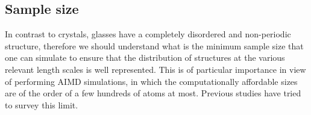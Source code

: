 



\subsection{Sample size}  \label{sec:silica-size}
In contrast to crystals, glasses have a completely disordered and non-periodic structure, therefore we should understand what is the minimum sample size that one can simulate to ensure that the distribution of structures at the various relevant length scales is well represented. This is of particular importance in view of performing AIMD simulations, in which the computationally affordable sizes are of the order of a few hundreds of atoms at most. Previous studies have tried to survey this limit. 

